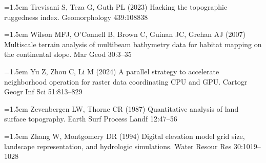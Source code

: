 \documentclass[10pt,a4paper]{article}
\begin{document}
\noindent\hangindent=1.5em Trevisani S, Teza G, Guth PL (2023) Hacking the topographic ruggedness index. Geomorphology 439:108838\par
\noindent\hangindent=1.5em Wilson MFJ, O'Connell B, Brown C, Guinan JC, Grehan AJ (2007) Multiscale terrain analysis of multibeam bathymetry data for habitat mapping on the continental slope. Mar Geod 30:3--35\par
\noindent\hangindent=1.5em Yu Z, Zhou C, Li M (2024) A parallel strategy to accelerate neighborhood operation for raster data coordinating CPU and GPU. Cartogr Geogr Inf Sci 51:813--829\par
\noindent\hangindent=1.5em Zevenbergen LW, Thorne CR (1987) Quantitative analysis of land surface topography. Earth Surf Process Landf 12:47--56\par
\noindent\hangindent=1.5em Zhang W, Montgomery DR (1994) Digital elevation model grid size, landscape representation, and hydrologic simulations. Water Resour Res 30:1019--1028\par
\endgroup
\end{document}
